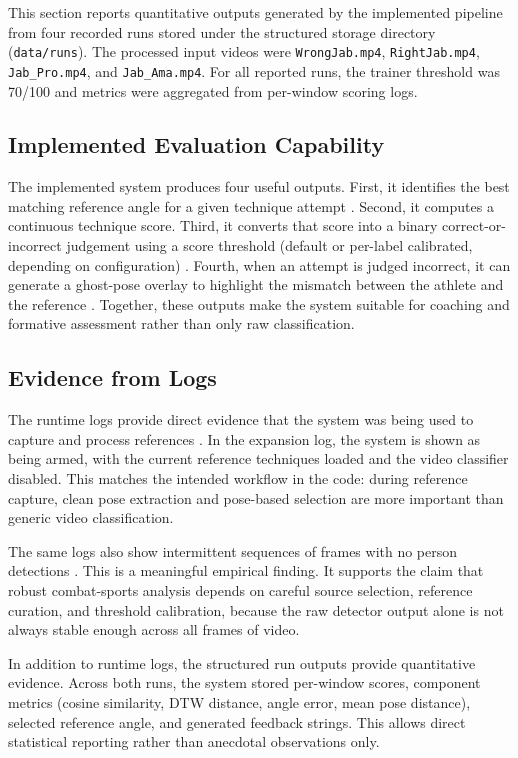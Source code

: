 \documentclass[12pt]{article}
\begin{document}
This section reports quantitative outputs generated by the implemented pipeline from four recorded runs stored under the structured storage directory (\texttt{data/runs}). The processed input videos were \texttt{WrongJab.mp4}, \texttt{RightJab.mp4}, \texttt{Jab\_Pro.mp4}, and \texttt{Jab\_Ama.mp4}. For all reported runs, the trainer threshold was 70/100 and metrics were aggregated from per-window scoring logs.

\subsection{Implemented Evaluation Capability}
The implemented system produces four useful outputs. First, it identifies the best matching reference angle for a given technique attempt \cite{projectActionRecognition}. Second, it computes a continuous technique score. Third, it converts that score into a binary correct-or-incorrect judgement using a score threshold (default or per-label calibrated, depending on configuration) \cite{projectActionRecognition,projectCalibrate}. Fourth, when an attempt is judged incorrect, it can generate a ghost-pose overlay to highlight the mismatch between the athlete and the reference \cite{projectActionRecognition}. Together, these outputs make the system suitable for coaching and formative assessment rather than only raw classification.

\subsection{Evidence from Logs}
The runtime logs provide direct evidence that the system was being used to capture and process references \cite{projectFrontKickLog,projectSeedLog}. In the expansion log, the system is shown as being armed, with the current reference techniques loaded and the video classifier disabled. This matches the intended workflow in the code: during reference capture, clean pose extraction and pose-based selection are more important than generic video classification.

The same logs also show intermittent sequences of frames with no person detections . This is a meaningful empirical finding. It supports the claim that robust combat-sports analysis depends on careful source selection, reference curation, and threshold calibration, because the raw detector output alone is not always stable enough across all frames of video.

In addition to runtime logs, the structured run outputs provide quantitative evidence. Across both runs, the system stored per-window scores, component metrics (cosine similarity, DTW distance, angle error, mean pose distance), selected reference angle, and generated feedback strings. This allows direct statistical reporting rather than anecdotal observations only.
\end{document}
